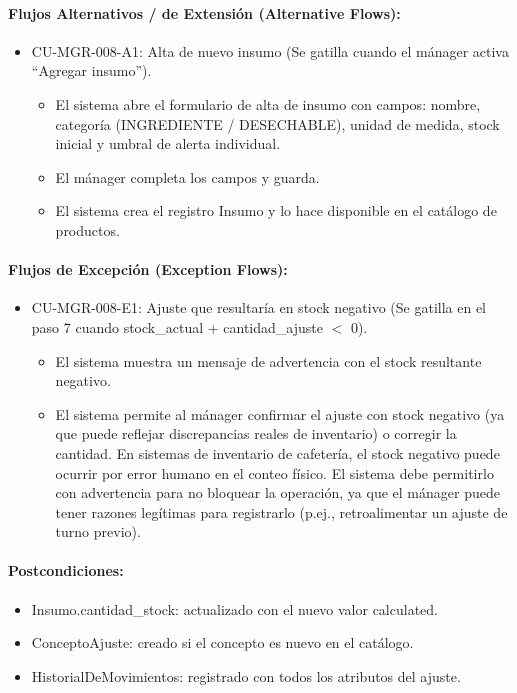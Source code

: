 \paragraph{Flujos Alternativos / de Extensión (Alternative Flows):}
\begin{itemize}
    \item CU-MGR-008-A1: Alta de nuevo insumo (Se gatilla cuando el mánager activa ``Agregar insumo'').
    \begin{itemize}
        \item El sistema abre el formulario de alta de insumo con campos: nombre, categoría (INGREDIENTE / DESECHABLE), unidad de medida, stock inicial y umbral de alerta individual.
        \item El mánager completa los campos y guarda.
        \item El sistema crea el registro Insumo y lo hace disponible en el catálogo de productos.
    \end{itemize}
\end{itemize}

\paragraph{Flujos de Excepción (Exception Flows):}
\begin{itemize}
    \item CU-MGR-008-E1: Ajuste que resultaría en stock negativo (Se gatilla en el paso 7 cuando stock\_actual + cantidad\_ajuste $<$ 0).
    \begin{itemize}
        \item El sistema muestra un mensaje de advertencia con el stock resultante negativo.
        \item El sistema permite al mánager confirmar el ajuste con stock negativo (ya que puede reflejar discrepancias reales de inventario) o corregir la cantidad. En sistemas de inventario de cafetería, el stock negativo puede ocurrir por error humano en el conteo físico. El sistema debe permitirlo con advertencia para no bloquear la operación, ya que el mánager puede tener razones legítimas para registrarlo (p.ej., retroalimentar un ajuste de turno previo).
    \end{itemize}
\end{itemize}

\paragraph{Postcondiciones:}
\begin{itemize}
    \item Insumo.cantidad\_stock: actualizado con el nuevo valor calculated.
    \item ConceptoAjuste: creado si el concepto es nuevo en el catálogo.
    \item HistorialDeMovimientos: registrado con todos los atributos del ajuste.
\end{itemize}

